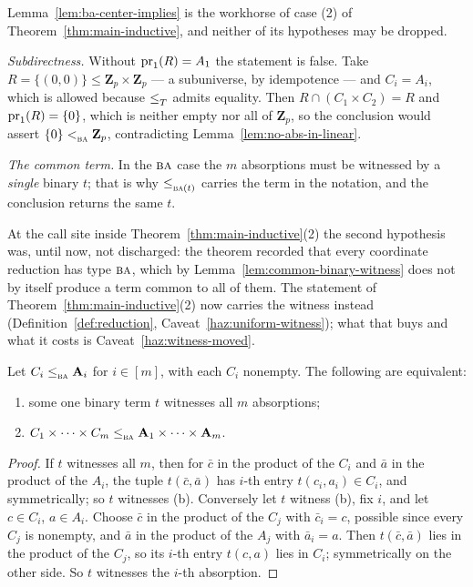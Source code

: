 \begin{hazard}
\label{haz:ba-center-implies}
Lemma~\ref{lem:ba-center-implies} is the workhorse of case (2) of
Theorem~\ref{thm:main-inductive}, and neither of its hypotheses may be dropped.

\emph{Subdirectness.} Without $\operatorname*{pr}_{1}(R)=A_{1}$ the statement is false. Take
$R=\{(0,0)\}\le\mathbf Z_{p}\times\mathbf Z_{p}$ --- a subuniverse, by
idempotence --- and $C_{i}=A_{i}$, which is allowed because $\le_{T}^{}$ admits
equality. Then $R\cap(C_{1}\times C_{2})=R$ and $\operatorname*{pr}_{1}(R)=\{0\}$, which is
neither empty nor all of $\mathbf Z_{p}$, so the conclusion would assert
$\{0\}<_{\textup{\textsc{ba}}}^{}\mathbf Z_{p}$, contradicting
Lemma~\ref{lem:no-abs-in-linear}.

\emph{The common term.} In the $\textup{\textsc{ba}}$ case the $m$ absorptions must be
witnessed by a \emph{single} binary $t$; that is why $\le_{\textup{\textsc{ba}}(t)}^{}$ carries
the term in the notation, and the conclusion returns the same $t$.

At the call site inside Theorem~\ref{thm:main-inductive}(2) the second
hypothesis was, until now, not discharged: the theorem recorded that every
coordinate reduction has type $\textup{\textsc{ba}}$, which by
Lemma~\ref{lem:common-binary-witness} does not by itself produce a term common
to all of them. The statement of Theorem~\ref{thm:main-inductive}(2) now
carries the witness instead (Definition~\ref{def:reduction},
Caveat~\ref{haz:uniform-witness}); what that buys and what it costs is
Caveat~\ref{haz:witness-moved}.
\end{hazard}

\begin{lemma}\label{lem:common-binary-witness}
Let $C_{i}\le_{\textup{\textsc{ba}}}^{}\mathbf A_{i}$ for $i\in[m]$, with each $C_{i}$ nonempty.
The following are equivalent:
\begin{enumerate}\alphlabels\tightlist
\item some one binary term $t$ witnesses all $m$ absorptions;
\item $C_{1}\times\dots\times C_{m}\le_{\textup{\textsc{ba}}}^{}\mathbf A_{1}\times\dots\times
  \mathbf A_{m}$.
\end{enumerate}
\end{lemma}

\begin{proof}
If $t$ witnesses all $m$, then for $\bar c$ in the product of the $C_{i}$ and
$\bar a$ in the product of the $A_{i}$, the tuple $t(\bar c,\bar a)$ has
$i$-th entry $t(c_{i},a_{i})\in C_{i}$, and symmetrically; so $t$ witnesses (b).
Conversely let $t$ witness (b), fix $i$, and let $c\in C_{i}$, $a\in A_{i}$.
Choose $\bar c$ in the product of the $C_{j}$ with $\bar c_{i}=c$, possible
since every $C_{j}$ is nonempty, and $\bar a$ in the product of the $A_{j}$
with $\bar a_{i}=a$. Then $t(\bar c,\bar a)$ lies in the product of the
$C_{j}$, so its $i$-th entry $t(c,a)$ lies in $C_{i}$; symmetrically on the
other side. So $t$ witnesses the $i$-th absorption.
\end{proof}

